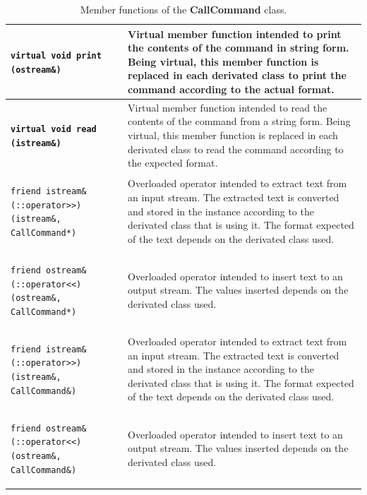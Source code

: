 \documentclass[11pt,twoside,openany,x11names,svgnames]{memoir}
\begin{document}
\begin{table}[h]
\begin{tabular}{| >{\bfseries}p{8.5cm} | p{7cm} |}
	\hline
	
	\texttt{virtual void print (ostream\&)} & Virtual member function intended to print the contents of the command in string form. Being virtual, this member function is replaced in each derivated class to print the command according to the actual format. \\
	
	\hline
	
	\texttt{virtual void read (istream\&)} & Virtual member function intended to read the contents of the command from a string form. Being virtual, this member function is replaced in each derivated class to read the command according to the expected format. \\
	
	\hline	
		
	\texttt{friend istream\& (::operator>>) (istream\&, CallCommand*)} & Overloaded operator intended to extract text from an input stream. The extracted text is converted and stored in the instance according to the derivated class that is using it. The format expected of the text depends on the derivated class used. \\
	
	\hline
	
	\texttt{friend ostream\& (::operator<<) (ostream\&, CallCommand*)} & Overloaded operator intended to insert text to an output stream. The values inserted depends on the derivated class used. \\
	
	\hline
	
	\texttt{friend istream\& (::operator>>) (istream\&, CallCommand\&)} & Overloaded operator intended to extract text from an input stream. The extracted text is converted and stored in the instance according to the derivated class that is using it. The format expected of the text depends on the derivated class used. \\
	
	\hline
	
	\texttt{friend ostream\& (::operator<<) (ostream\&, CallCommand\&)} & Overloaded operator intended to insert text to an output stream. The values inserted depends on the derivated class used. \\	
	
	\hline
\end{tabular}
\caption{Member functions of the \textbf{CallCommand} class.}
\label{tab:CallCommand-MemberFunctions}
\end{table}

\clearpage
\end{document}
